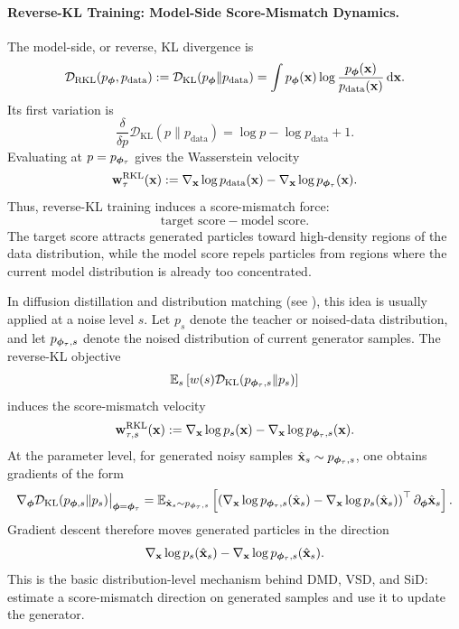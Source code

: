\paragraph{Reverse-KL Training: Model-Side Score-Mismatch Dynamics.}
The model-side, or reverse, KL divergence is
\[
    \mathcal{D}_{\mathrm{RKL}}(p_{{\bm{\phi}}},p_{\mathrm{data}})
    :=
    \mathcal D_{\mathrm{KL}}(p_{{\bm{\phi}}}\|p_{\mathrm{data}})
    =
    \int
    p_{{\bm{\phi}}}({\mathbf{x}})
    \log
    \frac{p_{{\bm{\phi}}}({\mathbf{x}})}
         {p_{\mathrm{data}}({\mathbf{x}})}
    \mathop{}\!\mathrm{d}{\mathbf{x}}.
\]
Its first variation is
\[
    \frac{\delta}{\delta p}
    \mathcal D_{\mathrm{KL}}(p\|p_{\mathrm{data}})
    =
    \log p-\log p_{\mathrm{data}}+1.
\]
Evaluating at $p=p_{{\bm{\phi}}_\tau}$ gives the Wasserstein velocity
\[
    {\mathbf{w}}_\tau^{\mathrm{RKL}}({\mathbf{x}})
    :=
    \nabla_{{\mathbf{x}}}\log p_{\mathrm{data}}({\mathbf{x}})
    -
    \nabla_{{\mathbf{x}}}\log p_{{\bm{\phi}}_\tau}({\mathbf{x}}).
\]
Thus, reverse-KL training induces a score-mismatch force:
\[
    \text{target score}
    -
    \text{model score}.
\]
The target score attracts generated particles toward high-density regions of the
data distribution, while the model score repels particles from regions where the
current model distribution is already too concentrated.

In diffusion distillation and distribution matching (see ), this idea is usually
applied at a noise level $s$.  Let $p_s$ denote the teacher or noised-data
distribution, and let $p_{{\bm{\phi}}_\tau,s}$ denote the noised distribution of
current generator samples.  The reverse-KL objective
\[
    \mathbb{E}_s
    \left[
        w(s)
        \mathcal D_{\mathrm{KL}}(p_{{\bm{\phi}}_\tau,s}\|p_s)
    \right]
\]
induces the score-mismatch velocity
\[
    {\mathbf{w}}_{\tau,s}^{\mathrm{RKL}}({\mathbf{x}})
    :=
    \nabla_{{\mathbf{x}}}\log p_s({\mathbf{x}})
    -
    \nabla_{{\mathbf{x}}}\log p_{{\bm{\phi}}_\tau,s}({\mathbf{x}}).
\]
At the parameter level, for generated noisy samples
$\hat{{\mathbf{x}}}_s\sim p_{{\bm{\phi}}_\tau,s}$, one obtains gradients of the form
\[
    \nabla_{{\bm{\phi}}}
    \mathcal D_{\mathrm{KL}}(p_{{\bm{\phi}},s}\|p_s)
    \big|_{{\bm{\phi}}={\bm{\phi}}_\tau}
    =
    \mathbb{E}_{\hat{{\mathbf{x}}}_s\sim p_{{\bm{\phi}}_\tau,s}}
    \left[
        \left(
            \nabla_{{\mathbf{x}}}\log p_{{\bm{\phi}}_\tau,s}(\hat{{\mathbf{x}}}_s)
            -
            \nabla_{{\mathbf{x}}}\log p_s(\hat{{\mathbf{x}}}_s)
        \right)^\top
        \partial_{{\bm{\phi}}}\hat{{\mathbf{x}}}_s
    \right].
\]
Gradient descent therefore moves generated particles in the direction
\[
    \nabla_{{\mathbf{x}}}\log p_s(\hat{{\mathbf{x}}}_s)
    -
    \nabla_{{\mathbf{x}}}\log p_{{\bm{\phi}}_\tau,s}(\hat{{\mathbf{x}}}_s).
\]
This is the basic distribution-level mechanism behind DMD, VSD, and SiD:
estimate a score-mismatch direction on generated samples and use it to update
the generator.

